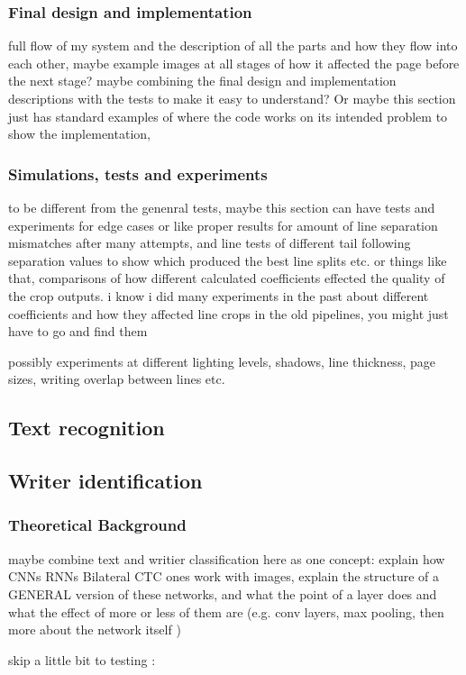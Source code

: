 \subsubsection{Final design and implementation}
full flow of my system and the description of all the parts and how they flow into each other, maybe example images at all stages of how it affected the page before the next stage? maybe combining the final design and implementation descriptions with the tests to make it easy to understand? Or maybe this section just has standard examples of where the code works on its intended problem to show the implementation, 
\subsubsection{Simulations, tests and experiments}
to be different from the genenral tests, maybe this section can have tests and experiments for edge cases or like proper results for amount of line separation mismatches after many attempts, and line tests of different tail following separation values to show which produced the best line splits etc. or things like that, comparisons of how different calculated coefficients effected the quality of the crop outputs. i know i did many experiments in the past about different coefficients and how they affected line crops in the old pipelines, you might just have to go and find them

possibly experiments at different lighting levels, shadows, line thickness, page sizes, writing overlap between lines etc.

\subsection{Text recognition}
\subsection{Writer identification}
\subsubsection{Theoretical Background}
maybe combine text and writier classification here as one concept: explain how CNNs RNNs Bilateral CTC ones work with images, explain the structure of a GENERAL version of these networks, and what the point of a layer does and what the effect of more or less of them are (e.g. conv layers, max pooling, then more about the network itself )

skip a little bit to testing :

